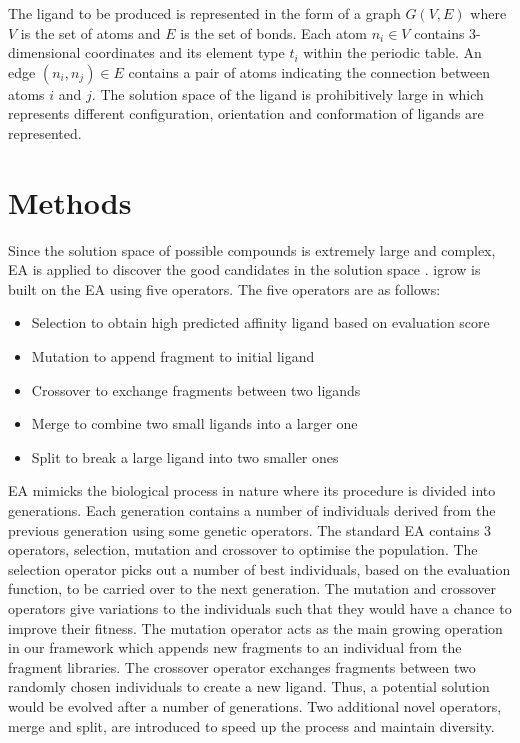 \documentclass[10pt,conference,letterpaper]{IEEEtran}
\begin{document}
The ligand to be produced is represented in the form of a graph $G(V,E)$ where $V$ is the set of atoms and $E$ is the set of bonds.
Each atom $n_{i}\in V$ contains 3-dimensional coordinates and its element type $t_{i}$ within the periodic table.
An edge $(n_{i},n_{j})\in E$ contains a pair of atoms indicating the connection between atoms $i$ and $j$.
The solution space of the ligand is prohibitively large in which represents different configuration, orientation and conformation of ligands are represented.

\section{Methods}\label{sec:methods and theory}
Since the solution space of possible compounds is extremely large and complex, EA is applied to discover the good candidates in the solution space \cite{ref15}.
igrow is built on the EA using five operators. The five operators are as follows:
\begin{itemize}
  \item Selection to obtain high predicted affinity ligand based on evaluation score
  \item Mutation to append fragment to initial ligand
  \item Crossover to exchange fragments between two ligands
  \item Merge to combine two small ligands into a larger one
  \item Split to break a large ligand into two smaller ones
\end{itemize}
EA mimicks the biological process in nature where its procedure is divided into generations.
Each generation contains a number of individuals derived from the previous generation using some genetic operators.
The standard EA contains 3 operators, selection, mutation and crossover to optimise the population.
The selection operator picks out a number of best individuals, based on the evaluation function, to be carried over to the next generation.
The mutation and crossover operators give variations to the individuals such that they would have a chance to improve their fitness.
The mutation operator acts as the main growing operation in our framework which appends new fragments to an individual from the fragment libraries.
The crossover operator exchanges fragments between two randomly chosen individuals to create a new ligand.
Thus, a potential solution would be evolved after a number of generations.
Two additional novel operators, merge and split, are introduced to speed up the process and maintain diversity.
\end{document}
